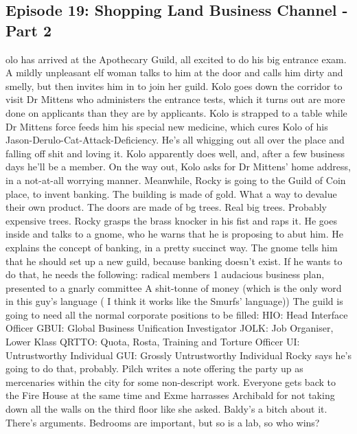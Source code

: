 \subsection{Episode 19: Shopping Land Business Channel - Part 2}
olo has arrived at the Apothecary Guild, all excited to do his big entrance exam. A mildly unpleasant elf woman talks to him at the door and calls him dirty and smelly, but then invites him in to join her guild.\medskip
Kolo goes down the corridor to visit Dr Mittens who administers the entrance tests, which it turns out are more done on applicants than they are by applicants.\medskip
Kolo is strapped to a table while Dr Mittens force feeds him his special new medicine, which cures Kolo of his Jason-Derulo-Cat-Attack-Deficiency. He’s all whigging out all over the place and falling off shit and loving it.\medskip
Kolo apparently does well, and, after a few business days he’ll be a member.\medskip
On the way out, Kolo asks for Dr Mittens’ home address, in a not-at-all worrying manner.\medskip
Meanwhile, Rocky is going to the Guild of Coin place, to invent banking.\medskip
The building is made of gold. What a way to devalue their own product.\medskip
The doors are made of bg trees. Real big trees. Probably expensive trees.\medskip
Rocky grasps the brass knocker in his fist and raps it.\medskip
He goes inside and talks to a gnome, who he warns that he is proposing to abut him.\medskip
He explains the concept of banking, in a pretty succinct way.\medskip
The gnome tells him that he should set up a new guild, because banking doesn’t exist. If he wants to do that, he needs the following: radical members 1 audacious business plan, presented to a gnarly committee A shit-tonne of money (which is the only word in this guy’s language ( I think it works like the Smurfs’ language))\medskip
The guild is going to need all the normal corporate positions to be filled:\medskip
HIO: Head Interface Officer\medskip
GBUI: Global Business Unification Investigator\medskip
JOLK: Job Organiser, Lower Klass\medskip
QRTTO: Quota, Rosta, Training and Torture Officer\medskip
UI: Untrustworthy Individual\medskip
GUI: Grossly Untrustworthy Individual\medskip
Rocky says he’s going to do that, probably.\medskip
Pilch writes a note offering the party up as mercenaries within the city for some non-descript work.\medskip
Everyone gets back to the Fire House at the same time and Exme harrasses Archibald for not taking down all the walls on the third floor like she asked. Baldy’s a bitch about it.\medskip
There’s arguments.\medskip
Bedrooms are important, but so is a lab, so who wins?\medskip

